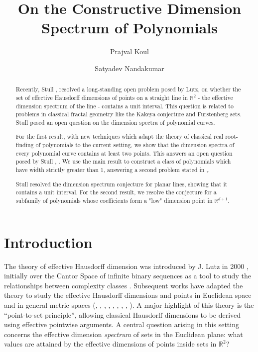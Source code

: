 \documentclass[a4paper,UKenglish,cleveref,autoref,thm-restate]{lipics-v2021}
\title{On the Constructive Dimension Spectrum of Polynomials} %
\author{Prajval Koul}{Department of Computer Science and Engineering, Indian Institute of Technology Kanpur, India. \and \url{https://prajvalkoul.github.io/}}{prajvalk21@iitk.ac.in}{https://orcid.org/0000-0002-8879-8330}{}
\author{Satyadev Nandakumar}{Department of Computer Science and Engineering, Indian Institute of Technology Kanpur, Kanpur, Uttar Pradesh, India. \and \url{https://www.cse.iitk.ac.in/users/satyadev/} }{satyadev@cse.iitk.ac.in}{https://orcid.org/0000-0002-0214-0598}{}
\newcommand{\R}{\mathbb{R}}
\begin{document}
\maketitle

\begin{abstract}
Recently, Stull \cite{Stull2025}, \cite{Stull2022} resolved a long-standing open problem posed by Lutz, on whether the set of effective Hausdorff dimensions of points on a straight line in $\R^2$ - the effective dimension spectrum of the line - contains a unit interval. This question is related to problems in classical fractal geometry like the Kakeya conjecture and Furstenberg sets. Stull posed an open question on the dimension spectra of polynomial curves. 
  
For the first result, with new techniques which adapt the theory of classical real root-finding of polynomials to the current setting, we show that the dimension spectra of every polynomial curve contains at least two points. This answers an open question posed by Stull \cite{Stull2025}, \cite{Stull2022}. We use the main result to construct a class of polynomials which have width strictly greater than 1, answering a second problem stated in \cite{Stull2025},\cite{Stull2022}. 
  
Stull \cite{Stull2025} resolved the dimension spectrum conjecture for planar lines, showing that it contains a unit interval. For the second result, we resolve the conjecture for a subfamily of polynomials whose coefficients form a "low" dimension point in $\mathbb{R}^{d+1}$. %
\end{abstract}




\section{Introduction}
The theory of effective Hausdorff dimension was introduced by J. Lutz in 2000 \cite{Lutz2000b}, \cite{Lutz2003b} initially over the Cantor Space of infinite binary sequences as a tool to study the relationships between complexity classes \cite{Lutz2003}. Subsequent works have adapted the theory to study the effective Hausdorff dimensions and points in Euclidean space and in general metric spaces (\cite{Lutz2008a}, \cite{Lutz2008c}, \cite{Turetsky2011}, \cite{Lutz2018}, \cite{Lutz2018c}, \cite{Stull2020}, \cite{Stull2022}, \cite{Lutz2023a}, \cite{Mayordomo2018}). A major highlight of this theory is the ``point-to-set principle'', allowing classical Hausdorff dimensions to be derived using effective pointwise arguments. A central question arising in this setting concerns the effective dimension \emph{spectrum} of sets in the Euclidean plane: what values are attained by the effective dimensions of points inside sets in $\R^2$? 
\end{document}
